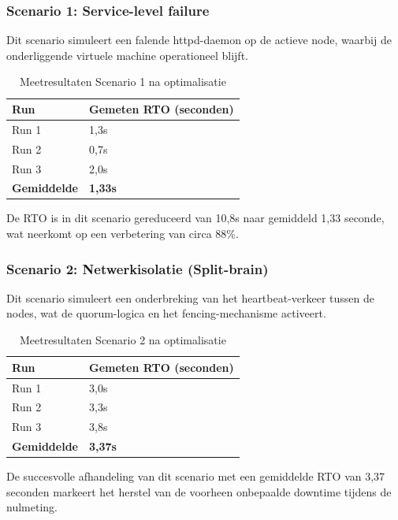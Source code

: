 \subsubsection{Scenario 1: Service-level failure}
Dit scenario simuleert een falende httpd-daemon op de actieve node, waarbij de onderliggende virtuele machine operationeel blijft.

\begin{table}[H]
    \centering
    \begin{tabular}{|l|l|}
        \hline
        \textbf{Run} & \textbf{Gemeten RTO (seconden)} \\ \hline
        Run 1 & 1,3s \\ \hline
        Run 2 & 0,7s \\ \hline
        Run 3 & 2,0s \\ \hline
        \textbf{Gemiddelde} & \textbf{1,33s} \\ \hline
    \end{tabular}
    \caption{Meetresultaten Scenario 1 na optimalisatie}
\end{table}

De RTO is in dit scenario gereduceerd van 10,8s naar gemiddeld 1,33 seconde, wat neerkomt op een verbetering van circa 88\%.

\subsubsection{Scenario 2: Netwerkisolatie (Split-brain)}
Dit scenario simuleert een onderbreking van het heartbeat-verkeer tussen de nodes, wat de quorum-logica en het fencing-mechanisme activeert.

\begin{table}[H]
    \centering
    \begin{tabular}{|l|l|}
        \hline
        \textbf{Run} & \textbf{Gemeten RTO (seconden)} \\ \hline
        Run 1 & 3,0s \\ \hline
        Run 2 & 3,3s \\ \hline
        Run 3 & 3,8s \\ \hline
        \textbf{Gemiddelde} & \textbf{3,37s} \\ \hline
    \end{tabular}
    \caption{Meetresultaten Scenario 2 na optimalisatie}
\end{table}

De succesvolle afhandeling van dit scenario met een gemiddelde RTO van 3,37 seconden markeert het herstel van de voorheen onbepaalde downtime tijdens de nulmeting.

